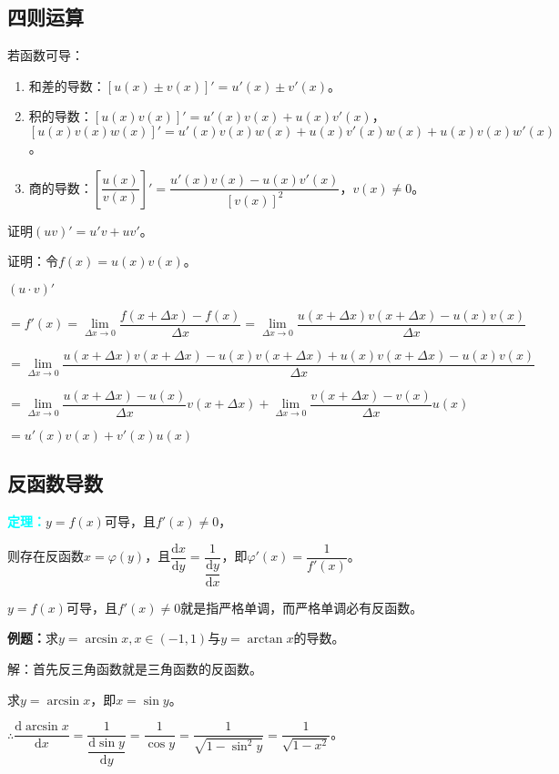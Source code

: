 \documentclass[UTF8, 12pt]{ctexart}
\begin{document}
\subsection{四则运算}

若函数可导：

\begin{enumerate}
    \item 和差的导数：$[u(x)\pm v(x)]'=u'(x)\pm v'(x)$。
    \item 积的导数：$[u(x)v(x)]'=u'(x)v(x)+u(x)v'(x)$，\\ $[u(x)v(x)w(x)]'=u'(x)v(x)w(x)+u(x)v'(x)w(x)+u(x)v(x)w'(x)$。
    \item 商的导数：$\left[\dfrac{u(x)}{v(x)}\right]'=\dfrac{u'(x)v(x)-u(x)v'(x)}{[v(x)]^2}$，$v(x)\neq 0$。
\end{enumerate}

证明$(uv)'=u'v+uv'$。

证明：令$f(x)=u(x)v(x)$。

$(u\cdot v)'$

$=f'(x)=\lim\limits_{\Delta x\to 0}\dfrac{f(x+\Delta x)-f(x)}{\Delta x}=\lim\limits_{\Delta x\to 0}\dfrac{u(x+\Delta x)v(x+\Delta x)-u(x)v(x)}{\Delta x}$

$=\lim\limits_{\Delta x\to 0}\dfrac{u(x+\Delta x)v(x+\Delta x)-u(x)v(x+\Delta x)+u(x)v(x+\Delta x)-u(x)v(x)}{\Delta x}$

$=\lim\limits_{\Delta x\to 0}\dfrac{u(x+\Delta x)-u(x)}{\Delta x}v(x+\Delta x) +\lim\limits_{\Delta x\to 0}\dfrac{v(x+\Delta x)-v(x)}{\Delta x}u(x)$

$=u'(x)v(x)+v'(x)u(x)$

\subsection{反函数导数}

\textcolor{aqua}{\textbf{定理：}}$y=f(x)$可导，且$f'(x)\neq 0$，

则存在反函数$x=\varphi(y)$，且$\dfrac{\textrm{d}x}{\textrm{d}y}=\dfrac{1}{\dfrac{\textrm{d}y}{\textrm{d}x}}$，即$\varphi'(x)=\dfrac{1}{f'(x)}$。\medskip

$y=f(x)$可导，且$f'(x)\neq 0$就是指严格单调，而严格单调必有反函数。

\textbf{例题：}求$y=\arcsin x,x\in(-1,1)$与$y=\arctan x$的导数。

解：首先反三角函数就是三角函数的反函数。

求$y=\arcsin x$，即$x=\sin y$。\medskip

$\therefore\dfrac{\textrm{d}\arcsin x}{\textrm{d}x}=\dfrac{1}{\dfrac{\textrm{d}\sin y}{\textrm{d}y}}=\dfrac{1}{\cos y}=\dfrac{1}{\sqrt{1-\sin^2y}}=\dfrac{1}{\sqrt{1-x^2}}$。\medskip
\end{document}
